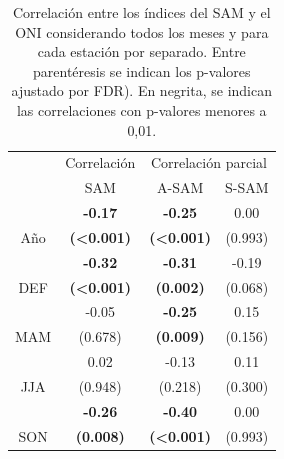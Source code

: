 \documentclass[12pt,oneside,a4paper]{reedthesis}
\begin{document}
\begin{table}

\caption{\label{tab:enso-cor-table}Correlación entre los índices del SAM y el ONI considerando todos los meses y para cada estación por separado. Entre parentéresis se indican los p-valores ajustado por FDR). En negrita, se indican las correlaciones con p-valores menores a 0,01.}
\centering
\begin{tabular}[t]{c>{}c>{}c>{}c}
\toprule
\multicolumn{1}{c}{ } & \multicolumn{1}{c}{Correlación} & \multicolumn{2}{c}{Correlación parcial} \\
\cmidrule(l{3pt}r{3pt}){2-2} \cmidrule(l{3pt}r{3pt}){3-4}
 & SAM & A-SAM & S-SAM\\
\midrule
 & \textbf{-0.17} & \textbf{-0.25} & 0.00\\
\cmidrule{2-4}
\multirow[t]{-2}{*}{\centering\arraybackslash Año} & \textbf{(<0.001)} & \textbf{(<0.001)} & (0.993)\\
\cmidrule{1-4}
 & \textbf{-0.32} & \textbf{-0.31} & -0.19\\
\cmidrule{2-4}
\multirow[t]{-2}{*}{\centering\arraybackslash DEF} & \textbf{(<0.001)} & \textbf{(0.002)} & (0.068)\\
\cmidrule{1-4}
 & -0.05 & \textbf{-0.25} & 0.15\\
\cmidrule{2-4}
\multirow[t]{-2}{*}{\centering\arraybackslash MAM} & (0.678) & \textbf{(0.009)} & (0.156)\\
\cmidrule{1-4}
 & 0.02 & -0.13 & 0.11\\
\cmidrule{2-4}
\multirow[t]{-2}{*}{\centering\arraybackslash JJA} & (0.948) & (0.218) & (0.300)\\
\cmidrule{1-4}
 & \textbf{-0.26} & \textbf{-0.40} & 0.00\\
\cmidrule{2-4}
\multirow[t]{-2}{*}{\centering\arraybackslash SON} & \textbf{(0.008)} & \textbf{(<0.001)} & (0.993)\\
\bottomrule
\end{tabular}
\end{table}
\end{document}
